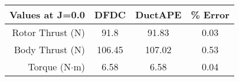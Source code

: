         \begin{tabular}{ r | c | c | c }
            Values at J=0.0 & DFDC & DuctAPE & \% Error \\
            \hline
            Rotor Thrust (N) & 91.8 & 91.83 & 0.03 \\
            Body Thrust (N) & 106.45 & 107.02 & 0.53 \\
            Torque (N\(\cdot\)m) & 6.58 & 6.58 & 0.04 \\
        \end{tabular}
